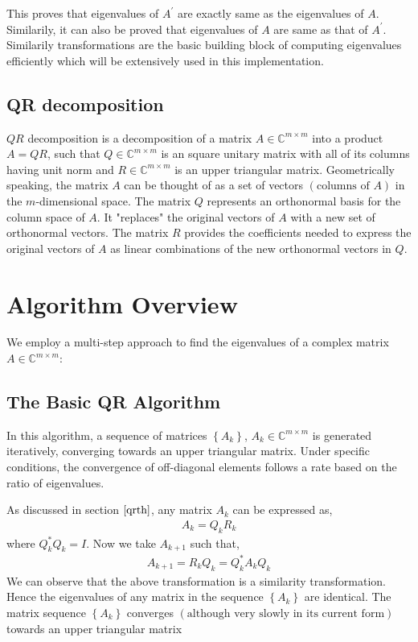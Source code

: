 \documentclass[12pt]{article}
\newcommand{\brak}[1]{\ensuremath{\left(#1\right)}}
\newcommand{\cbrak}[1]{\ensuremath{\left\{#1\right\}}}
\newcommand{\defmat}[2]{#1\in\mathbb{C}^{#2\times#2}}
\begin{document}
This proves that eigenvalues of $A^{\prime}$ are exactly same as the eigenvalues of $A$. Similarily, it can also be proved that eigenvalues of $A$ are same as that of $A^{\prime}$.
\newline
Similarily transformations are the basic building block of computing eigenvalues efficiently which will be extensively used in this implementation.

\subsection{QR decomposition} \label{qrth}
$QR$ decomposition is a decomposition of a matrix $\defmat{A}{m}$ into a product $A = QR$, such that $\defmat{Q}{m}$ is an square unitary matrix with all of its columns having unit norm and $\defmat{R}{m}$ is an upper triangular matrix. 
\newline
\newline
Geometrically speaking, the matrix $A$ can be thought of as a set of vectors \brak{\text{columns of } A} in the $m$-dimensional space.
The matrix $Q$ represents an orthonormal basis for the column space of $A$. It "replaces" the original vectors of $A$ with a new set of orthonormal vectors.
The matrix $R$ provides the coefficients needed to express the original vectors of $A$ as linear combinations of the new orthonormal vectors in $Q$.

\section{Algorithm Overview}
We employ a multi-step approach to find the eigenvalues of a complex matrix $\defmat{A}{m}$:

\subsection{The Basic QR Algorithm}
In this algorithm, a sequence of matrices $\cbrak{A_k}$, $\defmat{A_k}{m}$ is generated iteratively, converging towards an upper triangular matrix. Under specific conditions, the convergence of off-diagonal elements follows a rate based on the ratio of eigenvalues.

As discussed in section $\ref{qrth}$, any matrix $A_k$ can be expressed as,
\begin{align}
    A_k = Q_k R_k
\end{align}
where $Q_k^{\ast}Q_k = I$.
\newline
Now we take $A_{k+1}$ such that,
\begin{align}
    A_{k + 1} = R_k Q_k = Q_k^{\ast} A_k Q_k
\end{align}
We can observe that the above transformation is a similarity transformation. Hence the eigenvalues of any matrix in the sequence $\cbrak{A_k}$ are identical.
\newline
The matrix sequence $\cbrak{A_k}$ converges \brak{\text{although very slowly in its current form}} towards an upper triangular matrix
\end{document}

